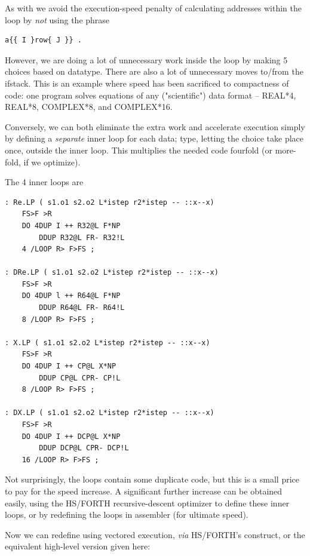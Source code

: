 As with  we avoid the execution-speed penalty of calculating addresses within the loop by \textit{not} using the phrase

\begin{verbatim}
a{{ I }row{ J }} .
\end{verbatim}

However, we are doing a lot of unnecessary work inside the loop by making 5 choices based on datatype. There are also a lot of unnecessary moves to/from the ifstack. This is an example where speed has been sacrificed to compactness of code: one program solves equations of any ("scientific") data format -- REAL*4, REAL*8, COMPLEX*8, and COMPLEX*16. 

Conversely, we can both eliminate the extra work and accelerate execution simply by defining a \textit{separate} inner loop for each data; type, letting the choice take place once, outside the inner loop. This multiplies the needed code fourfold (or more-fold, if we optimize).

The 4 inner loops are
\begin{verbatim}
: Re.LP ( s1.o1 s2.o2 L*istep r2*istep -- ::x--x)
    FS>F >R
    DO 4DUP I ++ R32@L F*NP
        DDUP R32@L FR- R32!L
    4 /LOOP R> F>FS ;

: DRe.LP ( s1.o1 s2.o2 L*istep r2*istep -- ::x--x)
    FS>F >R
    DO 4DUP l ++ R64@L F*NP
        DDUP R64@L FR- R64!L
    8 /LOOP R> F>FS ;

: X.LP ( s1.o1 s2.o2 L*istep r2*istep -- ::x--x)
    FS>F >R
    DO 4DUP I ++ CP@L X*NP
        DDUP CP@L CPR- CP!L
    8 /LOOP R> F>FS ;

: DX.LP ( s1.o1 s2.o2 L*istep r2*istep -- ::x--x)
    FS>F >R
    DO 4DUP I ++ DCP@L X*NP
        DDUP DCP@L CPR- DCP!L
    16 /LOOP R> F>FS ;
\end{verbatim} 
Not surprisingly, the loops contain some duplicate code, but this is a small price to pay for the speed increase. A significant further increase can be obtained easily, using the HS/FORTH recursive-descent optimizer to define these inner loops, or by redefining the loops in assembler (for ultimate speed).

Now we can redefine  using vectored execution, \textit{via} HS/FORTH's  construct, or the equivalent high-level version given here:

